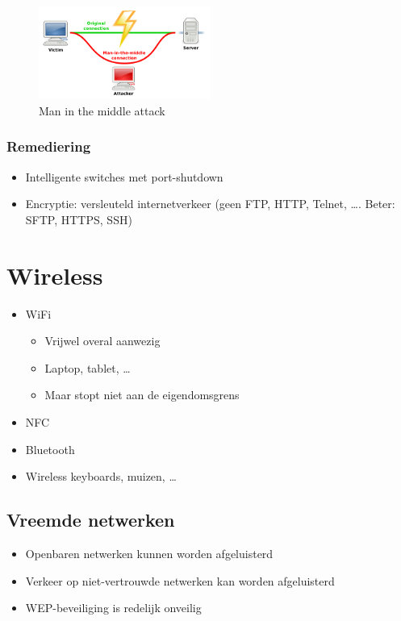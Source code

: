 \documentclass{article}
\begin{document}
\begin{figure}[H]
    \centering
    \includegraphics[width=0.5\textwidth]{mitm-attack.png}
    \caption{Man in the middle attack}
\end{figure}

\subsubsection{Remediering}
\begin{itemize}
    \item Intelligente switches met port-shutdown
    \item Encryptie: versleuteld internetverkeer (geen FTP, HTTP, Telnet, \dots. Beter: SFTP, HTTPS, SSH)
\end{itemize}

\section{Wireless}

\begin{itemize}
    \item WiFi
    \begin{itemize}
        \item Vrijwel overal aanwezig
        \item Laptop, tablet, \dots
        \item Maar stopt niet aan de eigendomsgrens 
    \end{itemize}
    \item NFC
    \item Bluetooth
    \item Wireless keyboards, muizen, \dots
\end{itemize}

\subsection{Vreemde netwerken}

\begin{itemize}
    \item Openbaren netwerken kunnen worden afgeluisterd
    \item Verkeer op niet-vertrouwde netwerken kan worden afgeluisterd
    \item WEP-beveiliging is redelijk onveilig
\end{itemize}
\end{document}
